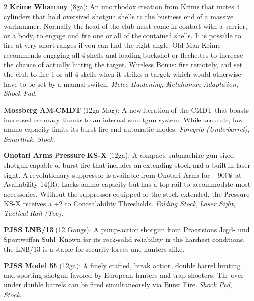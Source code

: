 \documentclass[
  oneside]{article}
\begin{document}
\begin{multicols}{2}
\textbf{Krime Whammy} (8ga): An unorthodox
creation from Krime that mates 4 cylinders that
hold oversized shotgun shells to the business end
of a massive warhammer. Normally the head of the
club must come in contact with a barrier, or a
body, to engage and fire one or all of the
contained shells. It is possible to fire at very
short ranges if you can find the right angle; Old
Man Krime recommends engaging all 4 shells and
loading buckshot or flechettes to increase the
chance of actually hitting the target. Wireless
Bonus: fire remotely, and set the club to fire 1
or all 4 shells when it strikes a target, which
would otherwise have to be set by a manual switch.
\emph{Melee Hardening}, \emph{Metahuman
Adaptation}, \emph{Shock Pad}.

\textbf{Mossberg AM-CMDT} (12ga Mag): A new
iteration of the CMDT that boasts increased
accuracy thanks to an internal smartgun system.
While accurate, low ammo capacity limits its burst
fire and automatic modes. \emph{Foregrip
(Underbarrel)}, \emph{Smartlink}, \emph{Stock}.

\textbf{Onotari Arms Pressure KS-X} (12ga): A
compact, submachine gun sized shotgun capable of
burst fire that includes an extending stock and a
built in laser sight. A revolutionary suppressor
is available from Onotari Arms for +900¥ at
Availability 14(R). Lacks ammo capacity but has a
top rail to accommodate most accessories. Without
the suppressor equipped or the stock extended, the
Pressure KS-X receives a +2 to Concealability
Thresholds. \emph{Folding Stock}, \emph{Laser
Sight}, \emph{Tactical Rail (Top)}.

\textbf{PJSS LNB/13} (12 Gauge): A pump-action
shotgun from Praezisions Jagd- und Sportwaffen
Suhl. Known for its rock-solid reliability in the
harshest conditions, the LNB/13 is a staple for
security forces and hunters alike.

\textbf{PJSS Model 55} (12ga): A finely crafted,
break action, double barrel hunting and sporting
shotgun favored by European hunters and trap
shooters. The over-under double barrels can be
fired simultaneously via Burst Fire. \emph{Shock
Pad}, \emph{Stock}.


\end{multicols}
\end{document}
